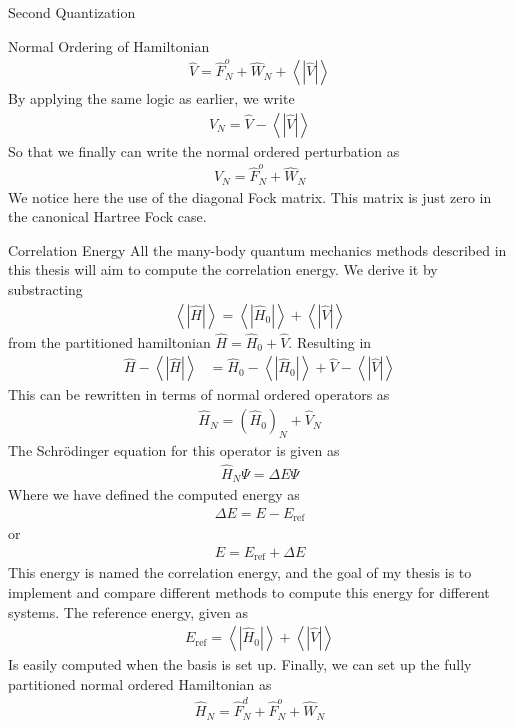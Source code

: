 \documentclass[twoside,english]{uiofysmaster}
\begin{document}
\begin{chapter}{Second Quantization}
\begin{section}{Normal Ordering of Hamiltonian}
		\begin{align}
			\hat V = \hat F_N^o + \hat W_N + \left< \right. | \hat V | \left. \right>
		\end{align}
		By applying the same logic as earlier, we write
		\begin{align}
			\hat V_N = \hat V - \left< \right. | \hat V | \left. \right>
		\end{align}
		So that we finally can write the normal ordered perturbation as
		\begin{align}
			\hat V_N = \hat F_N^o + \hat W_N
		\end{align}
		We notice here the use of the diagonal Fock matrix. This matrix is just zero in the canonical Hartree Fock case. 
	\end{section}

	\begin{section}{Correlation Energy}
		All the many-body quantum mechanics methods described in this thesis will aim to compute the correlation energy. We derive it by substracting 
		\begin{align}
			\left< \right. | \hat H | \left. \right> = \left< \right. | \hat H_0 | \left. \right> + \left< \right. | \hat V | \left. \right>
		\end{align}
		from the partitioned hamiltonian $\hat H = \hat H_0 + \hat V$. Resulting in
		\begin{align}
			\hat H - \left< \right. | \hat H | \left. \right> &= \hat H_0 - \left< \right. | \hat H_0 | \left. \right> + \hat V - \left< \right. |\hat V| \left. \right>
		\end{align}
		This can be rewritten in terms of normal ordered operators as 
		\begin{align}
			\hat H_N = (\hat H_0)_N + \hat V_N
		\end{align}
		The Schr\"{o}dinger equation for this operator is given as
		\begin{align}
			\hat H_N \Psi = \Delta E \Psi 
		\end{align}
		Where we have defined the computed energy as
		\begin{align}
			\Delta E = E - E_{\text{ref}}
		\end{align}
		or 
		\begin{align}
			E = E_{\text{ref}} + \Delta E
		\end{align}
		This energy is named the correlation energy, and the goal of my thesis is to implement and compare different methods to compute this energy for different systems. The reference energy, given as
		\begin{align}
			E_{\text{ref}} = \left< \right. | \hat H_0 | \left. \right> + \left< \right. | \hat V | \left. \right>
		\end{align}
		Is easily computed when the basis is set up. Finally, we can set up the fully partitioned normal ordered Hamiltonian as
		\begin{align}
			\hat H_N = \hat F_N^d + \hat F_N^o + \hat W_N
		\end{align}


\end{section}
\end{chapter}
\end{document}

